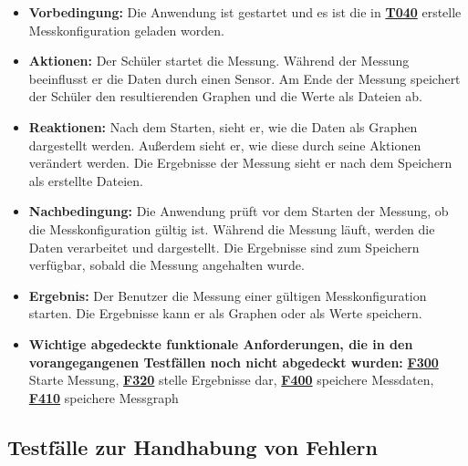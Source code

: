 \documentclass[parskip=full]{scrartcl}
\begin{document}
\begin{description}
\begin{itemize}
\item []\textbf{Vorbedingung:} Die Anwendung ist gestartet und es ist die in \hyperlink{link-t040}{\textbf{T040}} erstelle Messkonfiguration geladen worden.

\item []\textbf{Aktionen:} Der Schüler startet die Messung. Während der Messung beeinflusst er die Daten durch einen Sensor. Am Ende der Messung speichert der Schüler den resultierenden Graphen und die Werte als Dateien ab.
\item []\textbf{Reaktionen:} Nach dem Starten, sieht er, wie die Daten als Graphen dargestellt werden. Außerdem sieht er, wie diese durch seine Aktionen verändert werden. Die Ergebnisse der Messung sieht er nach dem Speichern als erstellte Dateien.
\item []\textbf{Nachbedingung:} Die Anwendung prüft vor dem Starten der Messung, ob die Messkonfiguration gültig ist. Während die Messung läuft, werden die Daten verarbeitet und dargestellt. Die Ergebnisse sind zum Speichern verfügbar, sobald die Messung angehalten wurde.


\item []\textbf{Ergebnis:} Der Benutzer die Messung einer gültigen Messkonfiguration starten. Die Ergebnisse kann er als Graphen oder als Werte speichern. 
\item []\textbf{Wichtige abgedeckte funktionale Anforderungen, die in den vorangegangenen Testfällen noch nicht abgedeckt wurden:} \hyperlink{link-f300}{\textbf{F300}} Starte Messung, \hyperlink{link-f320}{\textbf{F320}} stelle Ergebnisse dar, \hyperlink{link-f400}{\textbf{F400}} speichere Messdaten, \hyperlink{link-f410}{\textbf{F410}} speichere Messgraph


\end{itemize}
\end{description}

\subsection{Testfälle zur Handhabung von Fehlern}
\end{document}
